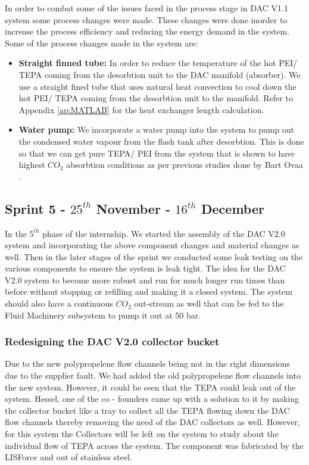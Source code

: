 In order to combat some of the issues faced in the process stage in DAC V1.1 system some process changes were made. These changes were done inorder to increase the process efficiency and reducing the energy demand in the system. Some of the process changes made in the system are: 

\begin{itemize}
    \item \textbf{Straight finned tube: }In order to reduce the temperature of the hot PEI/ TEPA coming from the desorbtion unit to the DAC manifold (absorber). We use a straight fined tube that uses natural heat convection to cool down the hot PEI/ TEPA coming from the desorbtion unit to the manifold. Refer to Appendix \ref{ap:MATLAB} for the heat exchanger length calculation. 
    
    \item \textbf{Water pump: }We incorporate a water pump into the system to pump out the condensed water vapour from the flash tank after desorbtion. This is done so that we can get pure TEPA/ PEI from the system that is shown to have highest $CO_2$ absorbtion conditions as per previous studies done by Bart Ovaa \cite{Ovaa2019}. 

\end{itemize}
  



\subsection{Sprint 5 - $25^{th}$ November - $16^{th}$ December}
\label{sec:sprint5}

In the $5^{th}$ phase of the internship. We started the assembly of the DAC V2.0 system and incorporating the above component changes and material changes as well. Then in the later stages of the sprint we conducted some leak testing on the various components to ensure the system is leak tight. The idea for the DAC V2.0 system to become more robust and run for much longer run times than before without stopping or refilling and making it a closed system. The system should also have a continuous $CO_2$ out-stream as well that can be fed to the Fluid Machinery subsystem to pump it out at 50 bar.

\subsubsection{Redesigning the DAC V2.0 collector bucket}

Due to the new polypropelene flow channels being not in the right dimensions due to the supplier fault. We had added the old polypropelene flow channels into the new system. However, it could be seen that the TEPA could leak out of the system. Hessel, one of the co - founders came up with a solution to it by making the collector bucket like a tray to collect all the TEPA flowing down the DAC flow channels thereby removing the need of the DAC collectors as well. However, for this system the Collectors will be left on the system to study about the individual flow of TEPA across the system. The component was fabricated by the LISForce and out of stainless steel. 

